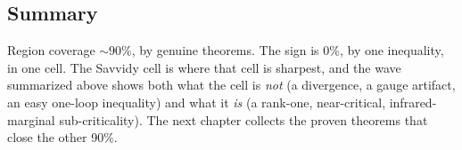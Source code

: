 \subsection{Summary}

Region coverage $\sim90\%$, by genuine theorems. The sign is 0\%, by one inequality, in one cell.
The Savvidy cell is where that cell is sharpest, and the wave summarized above shows both what
the cell is \emph{not} (a divergence, a gauge artifact, an easy one-loop inequality) and what it
\emph{is} (a rank-one, near-critical, infrared-marginal sub-criticality). The next chapter
collects the proven theorems that close the other 90\%.
